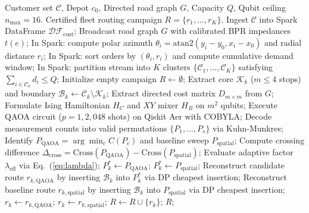 \documentclass[journal,10pt]{IEEEtran}
\begin{document}
\begin{algorithm}[t]
\caption{ROUTE/IQ Complete Optimization Workflow}
\label{alg:routeiq}
\begin{algorithmic}[1]
\REQUIRE Customer set $\mathcal{C}$, Depot $c_0$, Directed road graph $G$, Capacity $Q$, Qubit ceiling $n_{\text{max}} = 16$.
\ENSURE Certified fleet routing campaign $R = \{r_1, \dots, r_K\}$.
\STATE Ingest $\mathcal{C}$ into Spark DataFrame $\mathcal{DF}_{\text{cust}}$;
\STATE Broadcast road graph $G$ with calibrated BPR impedances $t(e)$;
\STATE In Spark: compute polar azimuth $\theta_i = \text{atan2}(y_i - y_0, x_i - x_0)$ and radial distance $r_i$;
\STATE In Spark: sort orders by $(\theta_i, r_i)$ and compute cumulative demand window;
\STATE In Spark: partition stream into $K$ clusters $\{\mathcal{C}_1, \dots, \mathcal{C}_K\}$ satisfying $\sum_{i \in \mathcal{C}_k} d_i \le Q$;
\STATE Initialize empty campaign $R \leftarrow \emptyset$;
    \STATE Extract core $\mathcal{K}_k$ ($m \le 4$ stops) and boundary $\mathcal{B}_k \leftarrow \mathcal{C}_k \setminus \mathcal{K}_k$;
    \STATE Extract directed cost matrix $D_{m \times m}$ from $G$;
    \STATE Formulate Ising Hamiltonian $H_C$ and $XY$ mixer $H_B$ on $m^2$ qubits;
    \STATE Execute QAOA circuit ($p=1, 2{,}048$ shots) on Qiskit Aer with COBYLA;
    \STATE Decode measurement counts into valid permutations $\{P_1, \dots, P_s\}$ via Kuhn-Munkres;
    \STATE Identify $P_{\text{QAOA}} = \arg\min_{c} C(P_c)$ and baseline sweep $P_{\text{spatial}}$;
    \STATE Compute crossing difference $\Delta_{\text{cross}} = \text{Cross}(P_{\text{QAOA}}) - \text{Cross}(P_{\text{spatial}})$;
    \STATE Evaluate adaptive factor $\lambda_{\text{eff}}$ via Eq.~(\ref{eq:lambda});
        \STATE $P_k^* \leftarrow P_{\text{QAOA}}$;
    \ELSE
        \STATE $P_k^* \leftarrow P_{\text{spatial}}$;
    \ENDIF
    \STATE Reconstruct candidate route $r_{k, \text{QAOA}}$ by inserting $\mathcal{B}_k$ into $P_k^*$ via DP cheapest insertion;
    \STATE Reconstruct baseline route $r_{k, \text{spatial}}$ by inserting $\mathcal{B}_k$ into $P_{\text{spatial}}$ via DP cheapest insertion;
        \STATE $r_k \leftarrow r_{k, \text{QAOA}}$;
    \ELSE
        \STATE $r_k \leftarrow r_{k, \text{spatial}}$; 
    \ENDIF
    \STATE $R \leftarrow R \cup \{r_k\}$;
\ENDFOR
\RETURN $R$;
\end{algorithmic}
\end{algorithm}
\end{document}
